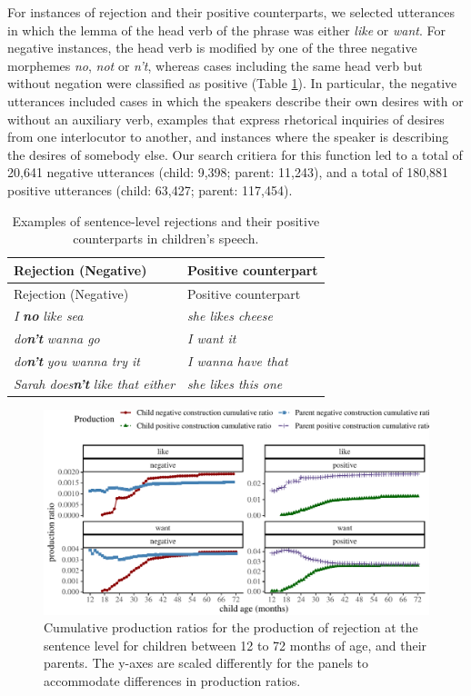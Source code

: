 \documentclass[
  man,floatsintext]{apa6}
\begin{document}
For instances of rejection and their positive counterparts, we selected utterances in which the lemma of the head verb of the phrase was either \emph{like} or \emph{want}. For negative instances, the head verb is modified by one of the three negative morphemes \emph{no}, \emph{not} or \emph{n't}, whereas cases including the same head verb but without negation were classified as positive (Table \ref{tab:rejection}). In particular, the negative utterances included cases in which the speakers describe their own desires with or without an auxiliary verb, examples that express rhetorical inquiries of desires from one interlocutor to another, and instances where the speaker is describing the desires of somebody else. Our search critiera for this function led to a total of 20,641 negative utterances (child: 9,398; parent: 11,243), and a total of 180,881 positive utterances (child: 63,427; parent: 117,454).

\begin{longtable}[]{@{}ll@{}}
\caption{\label{tab:rejection} Examples of sentence-level rejections and their positive counterparts in children's speech.}\tabularnewline
\toprule\noalign{}
Rejection (Negative) & Positive counterpart \\
\midrule\noalign{}
\endfirsthead
\toprule\noalign{}
Rejection (Negative) & Positive counterpart \\
\midrule\noalign{}
\endhead
\bottomrule\noalign{}
\endlastfoot
\emph{I} \textbf{\emph{no}} \emph{like sea} & \emph{she likes cheese} \\
\emph{do\textbf{n't}} \emph{wanna go} & \emph{I want it} \\
\emph{do\textbf{n't}} \emph{you wanna try it} & \emph{I wanna have that} \\
\emph{Sarah does\textbf{n't}} \emph{like that either} & \emph{she likes this one} \\
\end{longtable}

\begin{figure}[H]

{\centering \includegraphics{neg_construction_article_files/figure-latex/emotion-1} 

}

\caption{Cumulative production ratios for the production of rejection at the sentence level for children between 12 to 72 months of age, and their parents. The y-axes are scaled differently for the panels to accommodate differences in production ratios.}\label{fig:emotion}
\end{figure}
\end{document}
